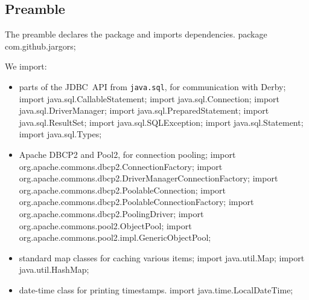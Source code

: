 \documentclass{article}
\def\nwendcode{\endtrivlist \endgroup}      %
\let\nwdocspar=\par
\theoremstyle{definition}                   %
\begin{document}
\subsection{Preamble}
\label{sec:preamble}
The preamble declares the package and imports dependencies.
\nwenddocs{}\endmoddef{}
package com.github.jargors;
\nwendcode{}\nwdocspar
We import:
\begin{itemize}
\item parts of the JDBC~API from {\tt{}java.sql}, for communication with Derby;
\nwenddocs{}\plusendmoddef
import java.sql.CallableStatement;   import java.sql.Connection;
import java.sql.DriverManager;       import java.sql.PreparedStatement;
import java.sql.ResultSet;           import java.sql.SQLException;
import java.sql.Statement;           import java.sql.Types;
\nwendcode{}\item Apache DBCP2 and Pool2, for connection pooling;
\nwenddocs{}\plusendmoddef
import org.apache.commons.dbcp2.ConnectionFactory;
import org.apache.commons.dbcp2.DriverManagerConnectionFactory;
import org.apache.commons.dbcp2.PoolableConnection;
import org.apache.commons.dbcp2.PoolableConnectionFactory;
import org.apache.commons.dbcp2.PoolingDriver;
import org.apache.commons.pool2.ObjectPool;
import org.apache.commons.pool2.impl.GenericObjectPool;
\nwendcode{}\item standard map classes for caching various items;
\nwenddocs{}\plusendmoddef
import java.util.Map;
import java.util.HashMap;
\nwendcode{}\item date-time class for printing timestamps.
\nwenddocs{}\plusendmoddef
import java.time.LocalDateTime;
\nwendcode{}\nwdocspar
\end{itemize}
\end{document}
